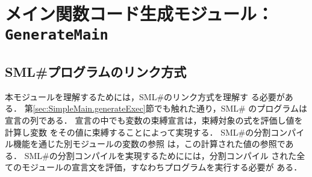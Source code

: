 \documentclass{jbook}
\newif\ifjp
\newcommand{\txt}[2]{#1}
\newcommand{\smlsharp}{SML\#}
\newcommand{\code}[1]{\mbox{\large\tt #1}}
\begin{document}
\else%
\fi%


% 
\chapter{\txt
{メイン関数コード生成モジュール：\code{GenerateMain}}
{The main function code generator : \code{GenerateMain}}
}
\label{chap:GenerateMain}

\ifjp%
\begin{enumerate}
\item ソースロケーションとファイル構成
ディレクトリ \code{src/compiler/generatemain}下の以下のファイルからなる．
\begin{itemize}
\item \code{GenerateMain.sml} 処理本体
\item \code{GenerateMainError.ppg} エラーメッセージ定義
\end{itemize}

\item 機能概要 
\begin{enumerate}
\item 各オブジェクトファイルのメイン関数名の生成
\item 各オブジェクトファイルのエントリコード生成
\item トップレベルファイルに対するメイン関数呼び出しコードの生成
\end{enumerate}

\item 他モジュールとのインターフェイス
\begin{itemize}
\item \code{src/compiler/toplevel2/main/Top.sml}から呼び出される．
\end{itemize}
\end{enumerate}
\else%
\fi%

\section{\txt{\smlsharp{}プログラムのリンク方式}{Linking \smlsharp{} programs}}
\ifjp%

	本モジュールを理解するためには，\smlsharp{}のリンク方式を理解す
る必要がある．
	第\ref{sec:SimpleMain.generateExec}節でも触れた通り，\smlsharp{}
のプログラムは宣言の列である．
	宣言の中でも変数の束縛宣言は，束縛対象の式を評価し値を計算し変数
をその値に束縛することによって実現する．
	\smlsharp{}の分割コンパイル機能を通じた別モジュールの変数の参照
は，この計算された値の参照である．
	\smlsharp{}の分割コンパイルを実現するためにには，分割コンパイル
された全てのモジュールの宣言文を評価，すなわちプログラムを実行する必要が
ある．
\end{document}
